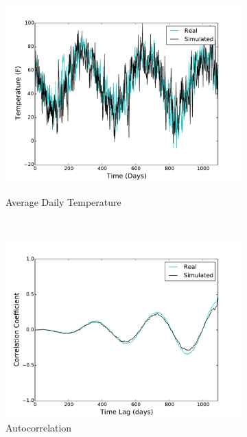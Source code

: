 \documentclass[11pt, letterpaper]{article}
\begin{document}
\begin{figure}[H]
  \centering
  \begin{subfigure}[b]{0.45\textwidth}
    \includegraphics[width=\textwidth]{figures/sim_temp.pdf}
    \label{fig:analysis-raw}
    \caption{Average Daily Temperature}
  \end{subfigure}
  ~
  \begin{subfigure}[b]{0.45\textwidth}
    \includegraphics[width=\textwidth]{figures/sim_temp_autocorr.pdf}
    \caption{\label{fig:analysis-autocorr} Autocorrelation}
  \end{subfigure}
  ~
  \begin{subfigure}[b]{0.45\textwidth}

\end{subfigure}
\end{figure}
\end{document}
